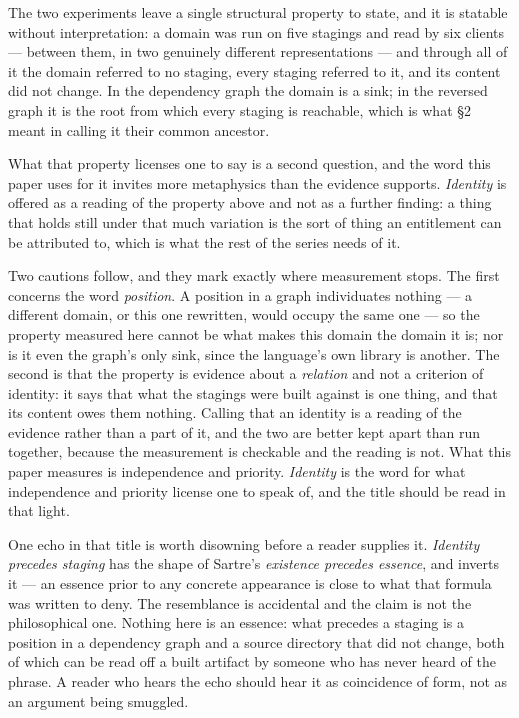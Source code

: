 \documentclass[
]{article}
\begin{document}
The two experiments leave a single structural property to state, and it
is statable without interpretation: a domain was run on five stagings
and read by six clients --- between them, in two genuinely different
representations --- and through all of it the domain referred to no
staging, every staging referred to it, and its content did not change.
In the dependency graph the domain is a sink; in the reversed graph it
is the root from which every staging is reachable, which is what §2
meant in calling it their common ancestor.

What that property licenses one to say is a second question, and the
word this paper uses for it invites more metaphysics than the evidence
supports. \emph{Identity} is offered as a reading of the property above
and not as a further finding: a thing that holds still under that much
variation is the sort of thing an entitlement can be attributed to,
which is what the rest of the series needs of it.

Two cautions follow, and they mark exactly where measurement stops. The
first concerns the word \emph{position}. A position in a graph
individuates nothing --- a different domain, or this one rewritten,
would occupy the same one --- so the property measured here cannot be
what makes this domain the domain it is; nor is it even the graph's only
sink, since the language's own library is another. The second is that
the property is evidence about a \emph{relation} and not a criterion of
identity: it says that what the stagings were built against is one
thing, and that its content owes them nothing. Calling that an identity
is a reading of the evidence rather than a part of it, and the two are
better kept apart than run together, because the measurement is
checkable and the reading is not. What this paper measures is
independence and priority. \emph{Identity} is the word for what
independence and priority license one to speak of, and the title should
be read in that light.

One echo in that title is worth disowning before a reader supplies it.
\emph{Identity precedes staging} has the shape of Sartre's
\emph{existence precedes essence}, and inverts it --- an essence prior
to any concrete appearance is close to what that formula was written to
deny. The resemblance is accidental and the claim is not the
philosophical one. Nothing here is an essence: what precedes a staging
is a position in a dependency graph and a source directory that did not
change, both of which can be read off a built artifact by someone who
has never heard of the phrase. A reader who hears the echo should hear
it as coincidence of form, not as an argument being smuggled.
\end{document}
